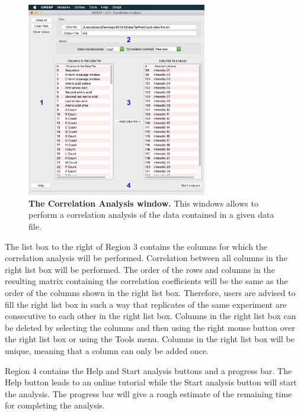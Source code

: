 \begin{figure}[h]
	\centering
	\includegraphics[width=0.7\textwidth]{./IMAGES/UTIL-CORR-WINDOW/util-corr.jpg}	    
	\caption[The Correlation Analysis window]{\textbf{The Correlation Analysis window.} This windows allows to perform a correlation analysis of the data contained in a given data file.} 
	\label{fig:corranalyset}
	\vspace{-5pt} 	
\end{figure}

The list box to the right of Region \num{3} contains the columns for which the correlation analysis will be performed. Correlation between all columns in the right list box will be performed. The  order of the rows and columns in the resulting matrix containing the correlation coefficients will be the same as the order of the columns shown in the right list box. Therefore, users are advised to fill the right list box in such a way that replicates of the same experiment are consecutive to each other in the right list box. Columns in the right list box can be deleted by selecting the columns and then using the right mouse button over the right list box or using the Tools menu. Columns in the right list box will be unique, meaning that a column can only be added once. 

Region \num{4} contains the Help and Start analysis buttons and a progress bar. The Help button leads to an online tutorial while the Start analysis button will start the analysis. The progress bar will give a rough estimate of the remaining time for completing the analysis.

